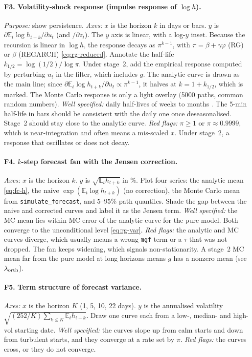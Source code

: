 \documentclass[11pt]{article}
\newcommand{\E}{\mathbb{E}}
\begin{document}
\paragraph{F3. Volatility-shock response (impulse response of $\log h$).}
\emph{Purpose:} show persistence.
\emph{Axes:} $x$ is the horizon $k$ in days or bars. $y$ is $\partial\E_t\log h_{t+k}/\partial u_t$
(and $/\partial z_t$). The $y$ axis is linear, with a log-$y$ inset.
Because the recursion is linear in $\log h$, the response decays as $\pi^{k-1}$, with
$\pi=\beta+\gamma\varphi$ (RG) or $\beta$ (REGARCH) \eqref{eq:rg-reduced}. Annotate the half-life
$k_{1/2}=\log(1/2)/\log\pi$. Under stage~2, add the empirical response computed by perturbing
$u_t$ in the filter, which includes $g$. The analytic curve is drawn as the main line; since
$\partial\E_t\log h_{t+k}/\partial u_t\propto\pi^{k-1}$, it halves at $k=1+k_{1/2}$, which is marked.
The Monte Carlo response is only a light overlay (5000 paths, common random numbers).
\emph{Well specified:} daily half-lives of weeks to months \cite{HHS2012}. The 5-min half-life in
bars should be consistent with the daily one once deseasonalised. Stage~2 should stay close to the
analytic curve.
\emph{Red flags:} $\pi\ge1$ or $\pi\approx0.9999$, which is near-integration and often means a
mis-scaled $x$. Under stage~2, a response that oscillates or does not decay.

\paragraph{F4. $k$-step forecast fan with the Jensen correction.}
\emph{Axes:} $x$ is the horizon $k$. $y$ is $\sqrt{\E_t h_{t+k}}$ in \%. Plot four series: the analytic mean
\eqref{eq:fc-h}, the naive $\exp(\E_t\log h_{t+k})$ (no correction), the Monte Carlo mean from
\texttt{simulate\_forecast}, and 5--95\% path quantiles.
Shade the gap between the naive and corrected curves and label it as the Jensen term.
\emph{Well specified:} the MC mean lies within MC error of the analytic curve for the pure model.
Both converge to the unconditional level \eqref{eq:rg-var}.
\emph{Red flags:} the analytic and MC curves diverge, which usually means a wrong
\texttt{mgf} term or a $\tau$ that was not dropped. The fan keeps widening, which signals
non-stationarity. A stage~2 MC mean far from the pure model at long horizons means $g$ has a
nonzero mean (see $\lambda_{\rm orth}$).

\paragraph{F5. Term structure of forecast variance.}
\emph{Axes:} $x$ is the horizon $K$ (1, 5, 10, 22 days). $y$ is the annualised volatility
$\sqrt{(252/K)\sum_{k\le K}\E_t h_{t+k}}$. Draw one curve each from a low-, median- and high-vol starting date.
\emph{Well specified:} the curves slope up from calm starts and down from turbulent starts, and
they converge at a rate set by $\pi$.
\emph{Red flags:} the curves cross, or they do not converge.
\end{document}
